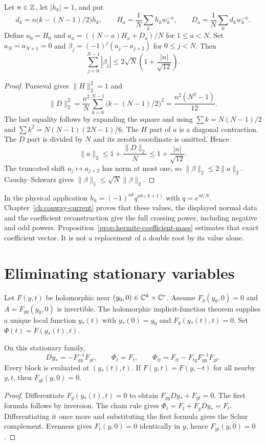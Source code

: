\begin{proposition}
\label{prop:hermite-coefficient-mass}
Let $n\in\mathbb Z$, let $|h_k|=1$, and put
\[
 d_k=n\bigl(k-(N-1)/2\bigr)h_k,\qquad
 H_a=\frac1N\sum_kh_kw_k^{-a},\qquad
 D_a=\frac1N\sum_kd_kw_k^{-a}.
\]
Define $a_0=H_0$ and
$a_a=((N-a)H_a+D_a)/N$ for $1\le a<N$.
Set $a_N=a_{N+1}=0$ and
$\beta_j=(-1)^j(a_j-a_{j+2})$ for $0\le j<N$. Then
\[
 \sum_{j=0}^{N-1}|\beta_j|
       \le2\sqrt N\left(1+\frac{|n|}{\sqrt{12}}\right).
\]
\end{proposition}
\begin{proof}
Parseval gives $\|H\|_2^2=1$ and
\[
 \|D\|_2^2
 =\frac{n^2}{N}\sum_{k=0}^{N-1}\bigl(k-(N-1)/2\bigr)^2
 =\frac{n^2(N^2-1)}{12}.
\]
The last equality follows by expanding the square and using
$\sum k=N(N-1)/2$ and
$\sum k^2=N(N-1)(2N-1)/6$.
The $H$ part of $a$ is a diagonal contraction. The $D$ part is
divided by $N$ and its zeroth coordinate is omitted. Hence
\[
 \|a\|_2\le1+\frac{\|D\|_2}{N}
             \le1+\frac{|n|}{\sqrt{12}}.
\]
The truncated shift $a_j\mapsto a_{j+2}$ has norm at most one,
so $\|\beta\|_2\le2\|a\|_2$. Cauchy--Schwarz gives
$\|\beta\|_1\le\sqrt N\|\beta\|_2$.
\end{proof}

In the physical application $h_k=(-1)^{nk}q^{nk(k+1)}$ with
$q=e^{\pi\ii/N}$. Chapter~\ref{ch:conway-current} proves that these
values, the displayed normal data and the coefficient reconstruction
give the full crossing power, including negative and odd powers.
Proposition~\ref{prop:hermite-coefficient-mass} estimates that exact
coefficient vector. It is not a replacement of a double root by
its value alone.

\section{Eliminating stationary variables}

Let $F(y,t)$ be holomorphic near $(y_0,0)\in\mathbb C^k\times\mathbb C^r$.
Assume $F_y(y_0,0)=0$ and $A=F_{yy}(y_0,0)$ is invertible.
The holomorphic implicit-function theorem supplies a unique local
function $y_*(t)$ with $y_*(0)=y_0$ and $F_y(y_*(t),t)=0$.
Set $\Phi(t)=F(y_*(t),t)$.

\begin{proposition}
\label{prop:stationary-schur}
On this stationary family,
\[
 Dy_*=-F_{yy}^{-1}F_{yt},\qquad
 \Phi_t=F_t,\qquad
 \Phi_{tt}=F_{tt}-F_{ty}F_{yy}^{-1}F_{yt}.
\]
Every block is evaluated at $(y_*(t),t)$. If
$F(y,t)=F(y,-t)$ for all nearby $y,t$, then $F_{yt}(y,0)=0$.
\end{proposition}
\begin{proof}
Differentiate $F_y(y_*(t),t)=0$ to obtain
$F_{yy}Dy_*+F_{yt}=0$. The first formula follows by inversion.
The chain rule gives
$\Phi_t=F_t+F_yDy_*=F_t$. Differentiating it once more and
substituting the first formula gives the Schur complement. Evenness
gives $F_t(y,0)=0$ identically in $y$, hence $F_{yt}(y,0)=0$.
\end{proof}

